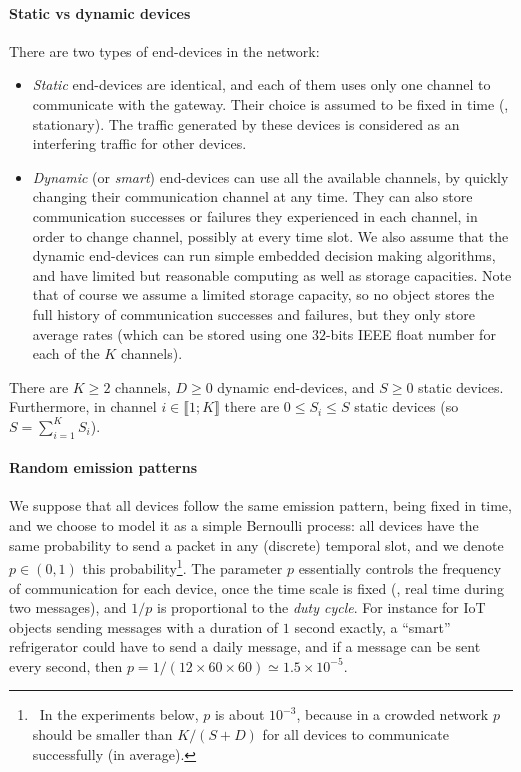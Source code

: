\paragraph{Static vs dynamic devices}
%
There are two types of end-devices in the network:
\begin{itemize}
    \item
    \emph{Static} end-devices are identical, and each of them uses only one channel to communicate with the gateway. Their choice is assumed to be fixed in time (\ie, stationary). The traffic generated by these devices is considered as an interfering traffic for other devices.
    \item
    \emph{Dynamic} (or \emph{smart}) end-devices can use all the available channels, by quickly changing their communication channel at any time. They can also store communication successes or failures they experienced in each channel, in order to change channel, possibly at every time slot.
    We also assume that the dynamic end-devices can run simple embedded decision making algorithms, and have limited but reasonable computing as well as storage capacities.
    Note that of course we assume a limited storage capacity, so no object stores the full history of communication successes and failures, but they only store average rates (which can be stored using one $32$-bits IEEE float number for each of the $K$ channels).
\end{itemize}

There are $K \geq 2$ channels, $D \geq 0$ dynamic end-devices, and $S \geq 0$ static devices.
Furthermore, in channel $i \in \llbracket 1; K \rrbracket$ there are $0 \leq S_i \leq S$ static devices (so $S = \sum_{i=1}^{K} S_i$).


\paragraph{Random emission patterns}
%
We suppose that all devices follow the same emission pattern, being fixed in time, and we choose to model it as a simple Bernoulli process:
all devices have the same probability to send a packet in any (discrete) temporal slot, and we denote $p \in (0, 1)$ this probability\footnote{~In the experiments below, $p$ is about $10^{-3}$, because in a crowded network $p$ should be smaller than $K / (S + D)$ for all devices to communicate successfully (in average).}.
The parameter $p$ essentially controls the frequency of communication for each device, once the time scale is fixed (\ie, real time during two messages), and $1/p$ is proportional to the \emph{duty cycle}.
For instance for IoT objects sending messages with a duration of $1$ second exactly, a ``smart'' refrigerator could have to send a daily message, and if a message can be sent every second, then $p = 1 / (12 \times 60 \times 60) \simeq 1.5 \times 10^{-5}$.

